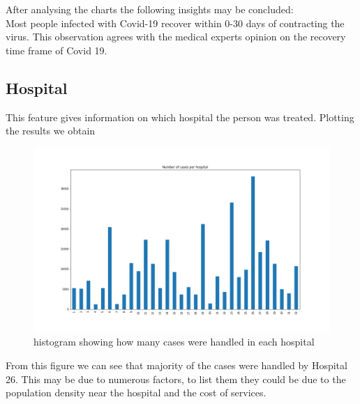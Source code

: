 \documentclass[fleqn]{article}
\begin{document}
			After analysing the charts the following insights may be concluded: \\
			Most people infected with Covid-19  recover within 0-30 days of contracting the virus.
			This observation agrees with the medical experts opinion on the recovery time frame 			of Covid 19.
			
		\newpage
		\subsection*{Hospital}
			This feature gives information on which hospital the person was treated.
			Plotting the results we obtain \\ 
			\begin{figure}[hb]
  				\includegraphics[width=\linewidth]{hospital_hist.png}
  				\caption{histogram showing how many cases were handled in each 							hospital}
  				\label{fig:3}
			\end{figure} 
			\FloatBarrier
			From this figure we can see that majority of the cases were handled by Hospital 26. This may be due to numerous factors, to list them they could be due to the population density near the hospital and the cost of services.
		
		\newpage
\end{document}
